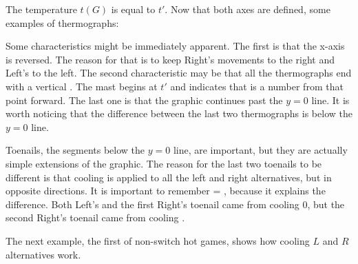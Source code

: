 The temperature $t(G)$ is equal to $t'$. Now that both axes are defined, some examples of thermographs:



Some characteristics might be immediately apparent. The first is that the x-axis is reversed. The reason for that is to keep Right's movements to the right and Left's to the left. The second characteristic may be that all the thermographs end with a vertical . The mast begins at $t'$ and indicates that \Gm{} is a number from that point forward. The last one is that the graphic continues past the $y=0$ line. It is worth noticing that the difference between the last two thermographs is below the $y=0$ line.

Toenails, the segments below the $y=0$ line, are important, but they are actually simple extensions of the graphic. The reason for the last two toenails to be different is that cooling is applied to all the left and right alternatives, but in opposite directions. It is important to remember  = , because it explains the difference. Both Left's and the first Right's toenail came from cooling 0, but the second Right's toenail came from cooling .

The next example, the first of non-switch hot games, shows how cooling $L$ and $R$ alternatives work.\\
\begin{center}
\end{center}









